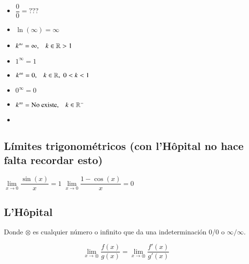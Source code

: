 \begin{multicols}{2}
\begin{itemize}
\item $\dfrac{0}{0} = ???$

\item $\ln (\infty) = \infty$

\item $k^\infty = \infty, \;\;\;k\in\mathbb{R}>1$

\item $1^\infty = 1$

\item $k^\infty = 0, \;\;\;k\in\mathbb{R},\; 0<k<1$

\item $0^\infty = 0$

\item $k^\infty =  \text{No existe}, \;\;\;k\in\mathbb{R}^-$
\item[]
\end{itemize}
\end{multicols}

\subsection*{Límites trigonométricos (con l'Hôpital no hace falta recordar esto)}

\hfil
$\lim\limits_{x\rightarrow 0} \dfrac{\sin(x)}{x} = 1$
\hfil
$\lim\limits_{x\rightarrow 0} \dfrac{1 - \cos(x)}{x} = 0$
\hfil

\subsection*{L'Hôpital}

Donde $\otimes$ es cualquier número o infinito que da una indeterminación 0/0 o $\infty/\infty$.

$$\lim\limits_{x\rightarrow \otimes}\dfrac{f(x)}{g(x)}=
\lim\limits_{x\rightarrow \otimes}\dfrac{f'(x)}{g'(x)}$$
